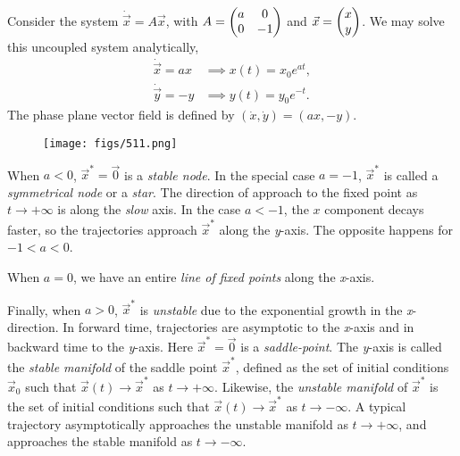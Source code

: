 \documentclass[oneside]{book}
\begin{document}
\begin{example}
	Consider the system $ \dot{\vec{x}} = A\vec{x} $, with $ A = \mqty(a & 0 \\ 0 & -1) $ and $ \vec{x} = \mqty(x \\ y) $. We may solve this uncoupled system analytically,
	\begin{align*}
		\dot{\vec{x}} = a x &\implies x(t) = x_0 e^{at}, \\
		\dot{\vec{y}} = - y &\implies y(t) = y_0 e^{-t}.
	\end{align*}
	The phase plane vector field is defined by $ (\dot{x}, \dot{y}) = (ax, -y) $. 
	\begin{figure}[h]
		\centering
		\texttt{[image: figs/511.png]}
	\end{figure}
\par
When $ a < 0 $, $ \vec{x}^* = \vec{0} $ is a \textit{stable node}. In the special case $ a = -1 $, $ \vec{x}^* $ is called a \textit{symmetrical node} or a \textit{star}. The direction of approach to the fixed point as $ t \to + \infty $ is along the \textit{slow} axis. In the case $ a < -1 $, the $ x $ component decays faster, so the trajectories approach $ \vec{x}^* $ along the \textit{y}-axis. The opposite happens for $ -1 < a < 0 $.
\par
When $ a = 0 $, we have an entire \textit{line of fixed points} along the \textit{x}-axis. 
\par
Finally, when $ a > 0 $, $ \vec{x}^* $ is \textit{unstable} due to the exponential growth in the \textit{x}-direction. In forward time, trajectories are asymptotic to the \textit{x}-axis and in backward time to the \textit{y}-axis. Here $ \vec{x}^* = \vec{0} $ is a \textit{saddle-point}. The \textit{y}-axis is called the \textit{stable manifold} of the saddle point $ \vec{x}^* $, defined as the set of initial conditions $ \vec{x}_0 $ such that $ \vec{x}(t) \to \vec{x}^* $ as $ t \to + \infty $. Likewise, the \textit{unstable manifold} of $ \vec{x}^* $ is the set of initial conditions such that $ \vec{x}(t) \to \vec{x}^* $ as $ t \to - \infty $. A typical trajectory asymptotically approaches the unstable manifold as $ t \to +\infty $, and approaches the stable manifold as $ t \to - \infty $.
\end{example}
\end{document}
